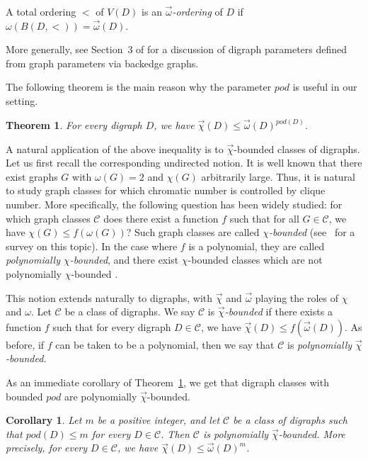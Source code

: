 \documentclass{article}
\newcommand{\dic}{\vec\chi}
\newcommand{\diomega}{\vec\omega}
\renewcommand{\le}{\leqslant}
\newtheorem{corollary}[lemma]{Corollary}
\newtheorem{theorem}[lemma]{Theorem}
\begin{document}
A total ordering $<$ of $V(D)$ is an \textit{$\diomega$-ordering} of $D$ if $\omega(B(D, <)) = \diomega(D)$.

More generally, see Section~3 of \cite{Digraph_parameter} for a discussion of digraph parameters defined from graph parameters via backedge graphs. 

The following theorem is the main reason why the parameter $pod$ is useful in our setting.
\begin{theorem}\label{thm:pod-main}
For every digraph $D$, we have $\dic(D)\le \diomega(D)^{pod(D)}$.
\end{theorem}

A natural application of the above inequality is to $\dic$-bounded classes of digraphs. Let us first recall the corresponding undirected notion.
It is well known that there exist graphs $G$ with $\omega(G)=2$ and $\chi(G)$ arbitrarily large. Thus, it is natural to study graph classes for which chromatic number is controlled by clique number.
More specifically, the following question has been widely studied: for which graph classes $\mathcal{C}$ does there exist a function $f$ such that for all $G\in\mathcal{C}$, we have $\chi(G)\le f(\omega(G))$? Such graph classes are called \textit{$\chi$-bounded} (see~\cite{scott2020survey} for a survey on this topic). In the case where $f$ is a polynomial, they are called \textit{polynomially $\chi$-bounded}, and there exist $\chi$-bounded classes which are not polynomially $\chi$-bounded \cite{separating}.

This notion extends naturally to digraphs, with $\dic$ and $\diomega$ playing the roles of $\chi$ and $\omega$. Let $\mathcal{C}$ be a class of digraphs. We say $\mathcal{C}$ is \textit{$\dic$-bounded} if there exists a function $f$ such that for every digraph $D \in \mathcal{C}$, we have $\dic(D) \leq f(\vec{\omega}(D))$. 
As before, if $f$ can be taken to be a polynomial, then we say that $\mathcal{C}$ is \textit{polynomially $\dic$-bounded.} 


As an immediate corollary of Theorem~\ref{thm:pod-main}, we get that digraph classes with bounded $pod$ are polynomially $\dic$-bounded.

\begin{corollary}\label{cor:poly-chi-pod}
Let $m$ be a positive integer, and let $\mathcal{C}$ be a class of digraphs such that
$pod(D)\le m$ for every $D\in\mathcal{C}$. Then $\mathcal{C}$ is polynomially $\dic$-bounded.
More precisely, for every $D\in\mathcal{C}$, we have $\dic(D)\le \diomega(D)^m$. 
\end{corollary}
\end{document}
